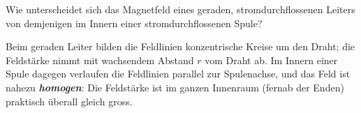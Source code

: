 \documentclass[addpoints,11pt,a4paper]{exam}
\newlength{\antwortraumlen}
\newcommand{\Antwortraum}[1]{%
  \pgfmathsetlength{\antwortraumlen}{#1*2.5cm}%
  \begin{answerbox}
    \rule{0pt}{\antwortraumlen}%
  \end{answerbox}%
}
\begin{document}
\begin{questions}
\begin{taskbox}
\question Wie unterscheidet sich das Magnetfeld eines geraden,
stromdurchflossenen Leiters von demjenigen im Innern einer
stromdurchflossenen Spule?
\Antwortraum{2}
\begin{solution}
Beim geraden Leiter bilden die Feldlinien konzentrische Kreise um den
Draht; die Feldstärke nimmt mit wachsendem Abstand $r$ vom Draht ab. Im
Innern einer Spule dagegen verlaufen die Feldlinien parallel zur
Spulenachse, und das Feld ist nahezu \textbf{\emph{homogen}}: Die
Feldstärke ist im ganzen Innenraum (fernab der Enden) praktisch überall
gleich gross.
\end{solution}
\end{taskbox}
\end{questions}
\end{document}
